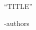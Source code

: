 \documentclass[12pt]{article}
\begin{document}
\begin{centering}
    {\large ``TITLE''}
\end{centering}
\begin{centering}
    -authors
\end{centering}


%
\end{document}
